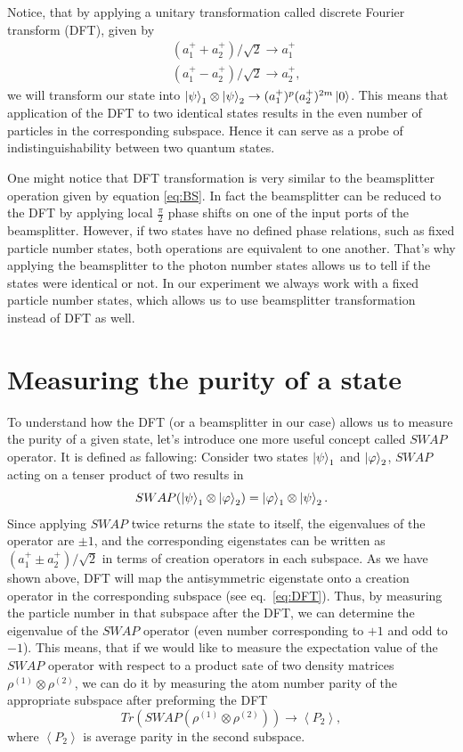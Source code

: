Notice, that by applying a unitary transformation called discrete Fourier transform (DFT), given by
\begin{equation}
\begin{aligned}
& (a_{1}^+ + a_{2}^+ )/\sqrt{2} \rightarrow a_{1}^+ \\
& (a_{1}^+ - a_{2}^+ )/\sqrt{2} \rightarrow a_{2}^+,
\end{aligned}
\label{eq:DFT}
\end{equation}
we will transform our state into $\left|\psi\right\rangle_1 \otimes \left|\psi\right\rangle_2 \rightarrow (a^+_1)^p (a^+_2)^{2m}\left|0\right\rangle$. This means that application of the DFT to two identical states results in the even number of particles in the corresponding subspace. Hence it can serve as a probe of indistinguishability between two quantum states.

One might notice that DFT transformation is very similar to the beamsplitter operation given by equation \ref{eq:BS}. In fact the beamsplitter can be reduced to the DFT by applying local $\frac{\pi}{2}$ phase shifts on one of the input ports of the beamsplitter. However, if two states have no defined phase relations, such as fixed particle number states, both operations are equivalent to one another. That's why applying the beamsplitter to the photon number states allows us to tell if the states were identical or not. In our experiment we always work with a fixed particle number states, which allows us to use beamsplitter transformation instead of DFT as well. 

\section{Measuring the purity of a state}
To understand how the DFT (or a beamsplitter in our case) allows us to measure the purity of a given state, let's introduce one more useful concept called $SWAP$ operator. It is defined as fallowing: Consider two states $\left|\psi\right\rangle_1$ and $\left|\varphi\right\rangle_2$, $SWAP$ acting on a tenser product of two results in 
\begin{equation}
SWAP(\left|\psi\right\rangle_1 \otimes \left|\varphi\right\rangle_2) = \left|\varphi\right\rangle_1 \otimes \left|\psi\right\rangle_2.
\end{equation}
Since applying $SWAP$ twice returns the state to itself, the eigenvalues of the operator are $\pm 1$, and the corresponding eigenstates can be written as $(a^+_1 \pm a^+_2)/\sqrt{2}$ in terms of creation operators in each subspace. As we have shown above, DFT will map the antisymmetric eigenstate onto a creation operator in the corresponding subspace (see eq.~\ref{eq:DFT}). Thus, by measuring the particle number in that subspace after the DFT, we can determine the eigenvalue of the $SWAP$ operator (even number corresponding to $+1$ and odd to $-1$). This means, that if we would like to measure the expectation value of the $SWAP$ operator with respect to a product sate of two density matrices $\rho^{(1)} \otimes \rho^{(2)}$, we can do it by measuring the atom number parity of the appropriate subspace after preforming the DFT
\begin{equation}
Tr(SWAP(\rho^{(1)} \otimes \rho^{(2)})) \rightarrow \left< P_2 \right>,
\end{equation}
where $\left< P_2 \right>$ is average parity in the second subspace. 